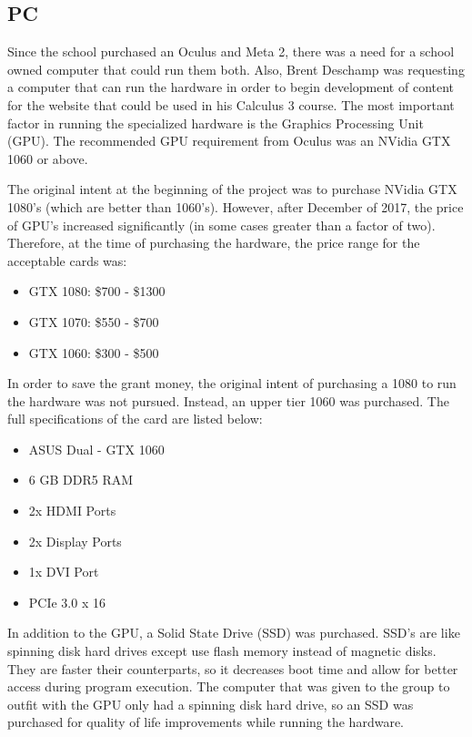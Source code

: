 
\subsection{PC}

    Since the school purchased an Oculus and Meta 2, there was a need for a school owned computer that could run them both.  Also, Brent Deschamp was requesting a computer that can run the hardware in order to begin development of content for the website that could be used in his Calculus 3 course.  The most important factor in running the specialized hardware is the Graphics Processing Unit (GPU).  The recommended GPU requirement from Oculus was an NVidia GTX 1060 or above.  

    The original intent at the beginning of the project was to purchase NVidia GTX 1080's (which are better than 1060's).  However, after December of 2017, the price of GPU's increased significantly (in some cases greater than a factor of two).  Therefore, at the time of purchasing the hardware, the price range for the acceptable cards was:

    \begin{itemize}
        \item GTX 1080: \$700 - \$1300
        \item GTX 1070: \$550 - \$700
        \item GTX 1060: \$300 - \$500 
    \end{itemize}

    In order to save the grant money, the original intent of purchasing a 1080 to run the hardware was not pursued.  Instead, an upper tier 1060 was purchased.  The full specifications of the card are listed below:

    \begin{itemize}
        \item ASUS Dual - GTX 1060
        \item 6 GB DDR5 RAM
        \item 2x HDMI Ports
        \item 2x Display Ports
        \item 1x DVI Port
        \item PCIe 3.0 x 16
    \end{itemize}

    In addition to the GPU, a Solid State Drive (SSD) was purchased.  SSD's are like spinning disk hard drives except use flash memory instead of magnetic disks.  They are faster their counterparts, so it decreases boot time and allow for better access during program execution.  The computer that was given to the group to outfit with the GPU only had a spinning disk hard drive, so an SSD was purchased for quality of life improvements while running the hardware.

